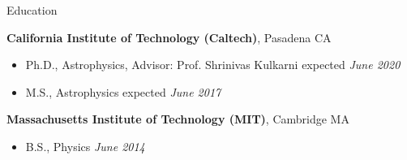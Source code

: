 \documentclass{resume} %
\begin{document}

\begin{rSection}{Education}

{\bf California Institute of Technology (Caltech)}, Pasadena CA
\begin{itemize}
\item Ph.D., Astrophysics,
  Advisor: Prof. Shrinivas Kulkarni \hfill expected {\em June 2020}
\end{itemize}

\begin{itemize}
  \item M.S., Astrophysics \hfill expected {\em June 2017}
\end{itemize}

{\bf Massachusetts Institute of Technology (MIT)}, Cambridge MA
\begin{itemize}
\item B.S., Physics \hfill {\em June 2014}
\end{itemize}

\end{rSection}


\end{document}
